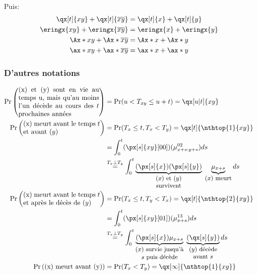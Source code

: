 \documentclass[10pt, french]{article}
\begin{document}
\begin{multicols*}{2}
Puis:
\begin{align*}
	\qx[t]{xy} + \qx[t]{\overline{xy}}	&=	\qx[t]{x} + \qx[t]{y}	\\
	\eringx{xy} + \eringx{\overline{xy}}	&=	\eringx{x} + \eringx{y}	\\
	\Ax*{xy} + \Ax*{\overline{xy}}	&=	\Ax*{x} + \Ax*{y}	\\
	\ax*{xy} + \ax*{\overline{xy}}	&=	\ax*{x} + \ax*{y}	\\
\end{align*}

\subsubsection*{D'autres notations}

	\setlength{\mathindent}{-1cm}
\begin{align*}
	\Pr\left(\parbox[1cm]{4.2cm}{(x) et (y) sont en vie au temps u, mais qu'au moins l'un décède au cours des $t$ prochaines années}\right)
		&=	\Pr(u	<	T_{xy}	\leq		u + t)	
		=	\qx[u | t]{xy}	\\
	\Pr\left(\parbox[1cm]{4cm}{(x) meurt avant le temps $t$\\ et avant $(y)$}\right)	
		&=	\Pr(T_{x}	\leq		t, T_{x}	<	T_{y})	
		=	\qx[t]{\nthtop{1}{xy}}	\\
		&=	\int_{0}^{t} (\px[s]{xy}[00])(\mu_{x + s : y + s}^{02})ds	\\
	&\overset{T_{x}	\perp	T_{y}}{=}	\int_{0}^{t}\underbrace{(\px[s]{x})(\px[s]{y})}_{\small\shortstack{$(x)$ et $(y)$\\ survivent}} \; \underbrace{\mu_{x + s}}_{\small\shortstack{$(x)$ meurt}}ds 	\\
	\Pr\left(\parbox[1cm]{4cm}{(x) meurt avant le temps $t$\\ et après le décès de $(y)$}\right)	
		&=	\Pr(T_{x}	\leq		t, T_{y}	<	T_{x})	
		=	\qx[t]{\nthtop{2}{xy}}	\\
		&=	\int_{0}^{t} (\px[s]{xy}[01])(\mu_{x + s}^{13})ds	\\
		&\overset{T_{x}	\perp	T_{y}}{=}	\int_{0}^{t}\underbrace{(\px[s]{x})\mu_{x + s}}_{\small\shortstack{$(x)$ survie jusqu'à\\ $s$ puis décède}} \; \underbrace{(\qx[s]{y})}_{\small\shortstack{$(y)$ décède\\ avant $s$}}ds	\\
	\Pr\left(\shortstack{(x) meurt avant (y)}\right)	
		&=	\Pr(T_{x}	<	T_{y})	
		=	\qx[\infty]{\nthtop{1}{xy}}	
\end{align*}
	\setlength{\mathindent}{1cm}


\end{multicols*}
\end{document}
